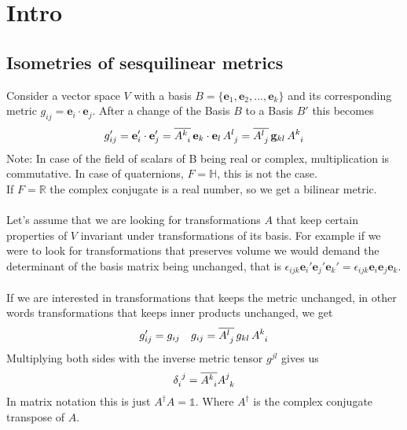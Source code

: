 \documentclass[11pt]{article}
\begin{document}
\section{Intro}

\subsection{Isometries of sesquilinear metrics}
Consider a vector space $V$ with a basis $B = \{\mathbf{e}_1, \mathbf{e}_2, ..., \mathbf{e}_k\}$ 
and its corresponding metric $g_{ij} = \mathbf{e}_i \cdot \mathbf{e}_j$.
After a change of the Basis $B$ to a Basis $B'$ this becomes
\begin{equation} 
    g_{ij}' 
    = \mathbf{e}_i' \cdot \mathbf{e}_j' 
    = \overline{A\indices{^k_i}} \,\mathbf{e}_k \cdot \mathbf{e}_l \, A\indices{^l_j}
    = \overline{A\indices{^l_j}} \, \mathbf{g}_{kl} \, A\indices{^k_i}
\end{equation}
Note: In case of the field of scalars of B being real or complex, multiplication is 
commutative. In case of quaternions, $F=\mathbb{H}$, this is not the case. \\
If $F=\mathbb{R}$ the complex conjugate is a real number, so we get a bilinear metric. \\
\\
Let's assume that we are looking for transformations $A$ that keep certain properties 
of $V$ invariant under transformations of its basis. For example if we were to look 
for transformations that preserves volume we would demand the determinant of the basis 
matrix being unchanged, that is $\epsilon_{ijk}\mathbf{e}_i'\mathbf{e}_j'\mathbf{e}_k'
= \epsilon_{ijk}\mathbf{e}_i\mathbf{e}_j\mathbf{e}_k$. \\
\\
If we are interested in transformations that keeps the metric unchanged, in other words 
transformations that keeps inner products unchanged, we get
\begin{equation}
    g_{ij}' = g_{ij} \quad
    g_{ij} = \overline{A\indices{^l_j}} \, g_{kl} \, A\indices{^k_i}
\end{equation}
Multiplying both sides with the inverse metric tensor $g^{jl}$ gives us
\begin{equation}
    \delta\indices{_i^j} = \overline{A\indices{^k_i}} A\indices{^j_k}
\end{equation}
In matrix notation this is just $A^\dagger A = \mathbb{1}$. Where $A^\dagger$ is the complex
conjugate transpose of $A$. \\
%
\end{document}
